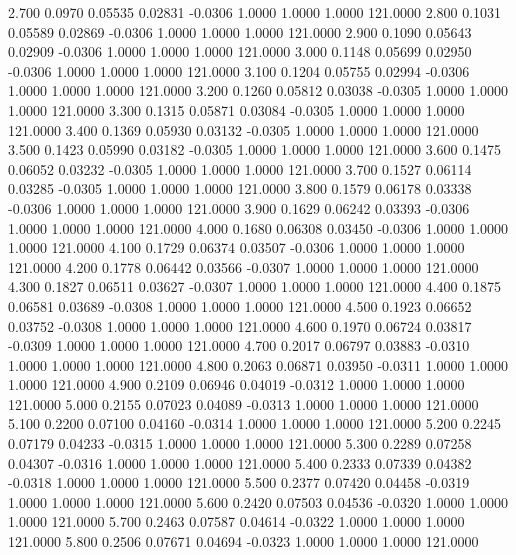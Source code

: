    2.700   0.0970   0.05535   0.02831  -0.0306   1.0000   1.0000   1.0000 121.0000
   2.800   0.1031   0.05589   0.02869  -0.0306   1.0000   1.0000   1.0000 121.0000
   2.900   0.1090   0.05643   0.02909  -0.0306   1.0000   1.0000   1.0000 121.0000
   3.000   0.1148   0.05699   0.02950  -0.0306   1.0000   1.0000   1.0000 121.0000
   3.100   0.1204   0.05755   0.02994  -0.0306   1.0000   1.0000   1.0000 121.0000
   3.200   0.1260   0.05812   0.03038  -0.0305   1.0000   1.0000   1.0000 121.0000
   3.300   0.1315   0.05871   0.03084  -0.0305   1.0000   1.0000   1.0000 121.0000
   3.400   0.1369   0.05930   0.03132  -0.0305   1.0000   1.0000   1.0000 121.0000
   3.500   0.1423   0.05990   0.03182  -0.0305   1.0000   1.0000   1.0000 121.0000
   3.600   0.1475   0.06052   0.03232  -0.0305   1.0000   1.0000   1.0000 121.0000
   3.700   0.1527   0.06114   0.03285  -0.0305   1.0000   1.0000   1.0000 121.0000
   3.800   0.1579   0.06178   0.03338  -0.0306   1.0000   1.0000   1.0000 121.0000
   3.900   0.1629   0.06242   0.03393  -0.0306   1.0000   1.0000   1.0000 121.0000
   4.000   0.1680   0.06308   0.03450  -0.0306   1.0000   1.0000   1.0000 121.0000
   4.100   0.1729   0.06374   0.03507  -0.0306   1.0000   1.0000   1.0000 121.0000
   4.200   0.1778   0.06442   0.03566  -0.0307   1.0000   1.0000   1.0000 121.0000
   4.300   0.1827   0.06511   0.03627  -0.0307   1.0000   1.0000   1.0000 121.0000
   4.400   0.1875   0.06581   0.03689  -0.0308   1.0000   1.0000   1.0000 121.0000
   4.500   0.1923   0.06652   0.03752  -0.0308   1.0000   1.0000   1.0000 121.0000
   4.600   0.1970   0.06724   0.03817  -0.0309   1.0000   1.0000   1.0000 121.0000
   4.700   0.2017   0.06797   0.03883  -0.0310   1.0000   1.0000   1.0000 121.0000
   4.800   0.2063   0.06871   0.03950  -0.0311   1.0000   1.0000   1.0000 121.0000
   4.900   0.2109   0.06946   0.04019  -0.0312   1.0000   1.0000   1.0000 121.0000
   5.000   0.2155   0.07023   0.04089  -0.0313   1.0000   1.0000   1.0000 121.0000
   5.100   0.2200   0.07100   0.04160  -0.0314   1.0000   1.0000   1.0000 121.0000
   5.200   0.2245   0.07179   0.04233  -0.0315   1.0000   1.0000   1.0000 121.0000
   5.300   0.2289   0.07258   0.04307  -0.0316   1.0000   1.0000   1.0000 121.0000
   5.400   0.2333   0.07339   0.04382  -0.0318   1.0000   1.0000   1.0000 121.0000
   5.500   0.2377   0.07420   0.04458  -0.0319   1.0000   1.0000   1.0000 121.0000
   5.600   0.2420   0.07503   0.04536  -0.0320   1.0000   1.0000   1.0000 121.0000
   5.700   0.2463   0.07587   0.04614  -0.0322   1.0000   1.0000   1.0000 121.0000
   5.800   0.2506   0.07671   0.04694  -0.0323   1.0000   1.0000   1.0000 121.0000
